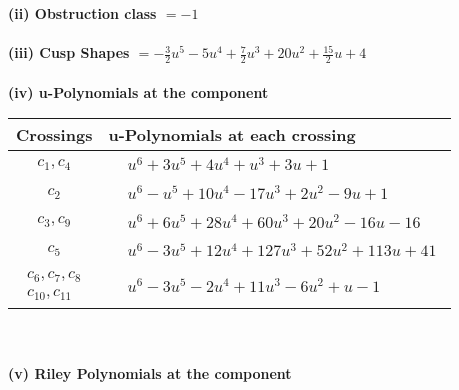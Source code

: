 \documentclass[1p]{elsarticle_modified}
\theoremstyle{definition}
\begin{document}
\flushleft \textbf{(ii) Obstruction class $= -1$}\\~\\
\flushleft \textbf{(iii) Cusp Shapes $= -\frac{3}{2} u^5-5 u^4+\frac{7}{2} u^3+20 u^2+\frac{15}{2} u+4$}\\~\\
\newpage\renewcommand{\arraystretch}{1}
\flushleft \textbf{(iv) u-Polynomials at the component}\newline \\
\begin{tabular}{m{50pt}|m{274pt}}
Crossings & \hspace{64pt}u-Polynomials at each crossing \\
\hline $$\begin{aligned}c_{1},c_{4}\end{aligned}$$&$\begin{aligned}
&u^6+3 u^5+4 u^4+u^3+3 u+1
\end{aligned}$\\
\hline $$\begin{aligned}c_{2}\end{aligned}$$&$\begin{aligned}
&u^6- u^5+10 u^4-17 u^3+2 u^2-9 u+1
\end{aligned}$\\
\hline $$\begin{aligned}c_{3},c_{9}\end{aligned}$$&$\begin{aligned}
&u^6+6 u^5+28 u^4+60 u^3+20 u^2-16 u-16
\end{aligned}$\\
\hline $$\begin{aligned}c_{5}\end{aligned}$$&$\begin{aligned}
&u^6-3 u^5+12 u^4+127 u^3+52 u^2+113 u+41
\end{aligned}$\\
\hline $$\begin{aligned}c_{6},c_{7},c_{8}\\c_{10},c_{11}\end{aligned}$$&$\begin{aligned}
&u^6-3 u^5-2 u^4+11 u^3-6 u^2+u-1
\end{aligned}$\\
\hline
\end{tabular}\\~\\
\newpage\renewcommand{\arraystretch}{1}
\flushleft \textbf{(v) Riley Polynomials at the component}\newline \\
\end{document}
